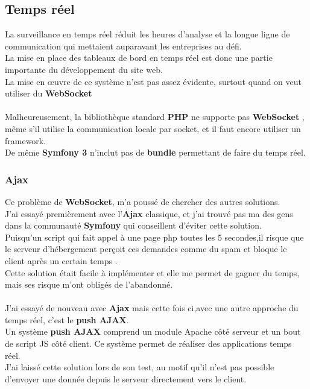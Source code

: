 \documentclass[12pt]{article}
\begin{document}
\subsection{Temps réel}

 La surveillance en temps réel réduit les heures d'analyse et la longue ligne de communication qui mettaient auparavant les entreprises au défi.\\  
 La mise en place des tableaux de bord en temps réel est donc  une partie importante du développement du site web.\\ 
 

 La mise en œuvre de ce système n'est pas assez évidente, surtout 
 quand on veut utiliser du \textbf{WebSocket} \\ \\
 
 Malheureusement, la bibliothèque standard \textbf{PHP} ne supporte pas \textbf{WebSocket} , même s'il utilise la communication locale par socket, et il faut encore utiliser un framework.\\
 De même \textbf{Symfony 3 }  n'inclut pas de \textbf{bundle} 
 permettant de faire du temps réel.


\subsubsection{Ajax}
Ce problème de \textbf{WebSocket}, m'a poussé de chercher des
autres solutions.\\ 

J'ai essayé premièrement avec l'\textbf{Ajax} classique, et j'ai 
trouvé pas ma des gens dans la communauté \textbf{Symfony} qui
conseillent d’éviter cette solution.\\
Puisqu'un script qui fait appel à une page php toutes les 5 secondes,il risque que   le serveur d'hébergement perçoit ces demandes comme du spam et bloque le client après un certain temps .\\
Cette solution était facile à implémenter et elle me permet de gagner du temps, mais ses risque m'ont obligés de l'abandonné.\\


\\
J'ai essayé de nouveau avec \textbf{Ajax} mais cette fois ci,avec une autre approche du temps réel, c'est le \textbf{push AJAX}.\\
 Un système \textbf{push AJAX} comprend  un module Apache côté serveur et un bout de script JS côté client. Ce système permet de réaliser des applications temps réel.\\
 J'ai laissé cette solution lors de son test, au motif qu'il n’est pas possible d’envoyer une donnée depuis le serveur directement vers le client.
\end{document}
